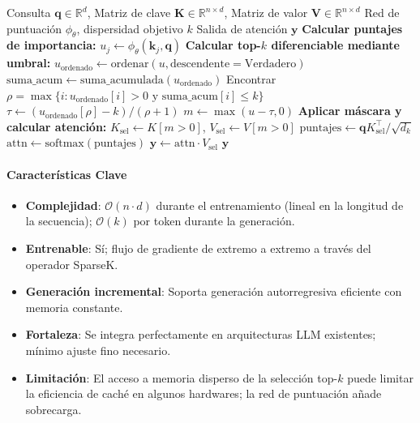 \begin{algorithm}[H]
\caption{SparseK: Atención Top-$k$ Diferenciable}
\begin{algorithmic}[1]
\Require Consulta $\mathbf{q} \in \mathbb{R}^d$, Matriz de clave $\mathbf{K} \in \mathbb{R}^{n \times d}$, Matriz de valor $\mathbf{V} \in \mathbb{R}^{n \times d}$
\Require Red de puntuación $\phi_\theta$, dispersidad objetivo $k$
\Ensure Salida de atención $\mathbf{y}$
\State \textbf{Calcular puntajes de importancia:}
    \State $u_j \gets \phi_\theta(\mathbf{k}_j, \mathbf{q})$
\EndFor
\State \textbf{Calcular top-$k$ diferenciable mediante umbral:}
\State $u_{\text{ordenado}} \gets \text{ordenar}(u, \text{descendente}=\text{Verdadero})$
\State $\text{suma\_acum} \gets \text{suma\_acumulada}(u_{\text{ordenado}})$
\State Encontrar $\rho = \max\{i : u_{\text{ordenado}}[i] > 0 \text{ y suma\_acum}[i] \leq k\}$
\State $\tau \gets (u_{\text{ordenado}}[\rho] - k) / (\rho + 1)$ 
\State $m \gets \max(u - \tau, 0)$ 
\State \textbf{Aplicar máscara y calcular atención:}
\State $K_{\text{sel}} \gets K[m > 0]$, $V_{\text{sel}} \gets V[m > 0]$
\State $\text{puntajes} \gets \mathbf{q} K_{\text{sel}}^\top / \sqrt{d_k}$
\State $\text{attn} \gets \text{softmax}(\text{puntajes})$
\State $\mathbf{y} \gets \text{attn} \cdot V_{\text{sel}}$
\Return $\mathbf{y}$
\end{algorithmic}
\end{algorithm}

\paragraph{Características Clave}

\begin{itemize}[leftmargin=*]
    \item \textbf{Complejidad}: $\mathcal{O}(n \cdot d)$ durante el entrenamiento (lineal en la longitud de la secuencia); $\mathcal{O}(k)$ por token durante la generación.
    \item \textbf{Entrenable}: Sí; flujo de gradiente de extremo a extremo a través del operador SparseK.
    \item \textbf{Generación incremental}: Soporta generación autorregresiva eficiente con memoria constante.
    \item \textbf{Fortaleza}: Se integra perfectamente en arquitecturas LLM existentes; mínimo ajuste fino necesario.
    \item \textbf{Limitación}: El acceso a memoria disperso de la selección top-$k$ puede limitar la eficiencia de caché en algunos hardwares; la red de puntuación añade sobrecarga.
\end{itemize}


